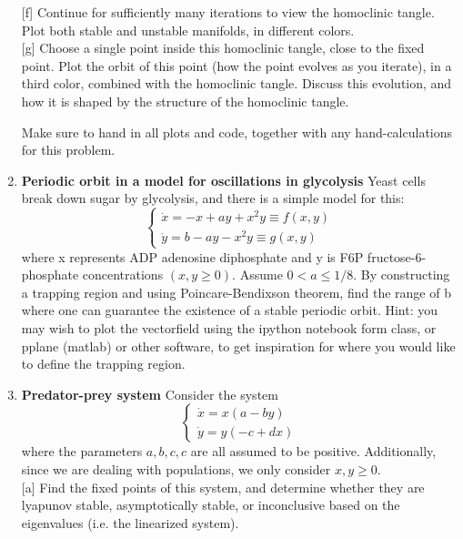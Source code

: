 \documentclass{article}
\begin{document}
\begin{enumerate}
[f] Continue for sufficiently many iterations to view the homoclinic tangle.
Plot both
stable and unstable manifolds, in different colors.\\

[g] Choose a single point inside this homoclinic tangle, close to the fixed point.
Plot the orbit of this point (how the point evolves as you iterate), in a third
color, combined with the homoclinic tangle. Discuss this evolution, and how it is shaped by the structure of the homoclinic tangle.  

Make sure to hand in all plots and code, together with any hand-calculations for this problem.

\item \textbf{Periodic orbit in a model for oscillations in glycolysis} Yeast cells break down
sugar by glycolysis, and there is a simple model for this:
\begin{equation}
\left\{\begin{array}{l}
\dot{x}=-x+a y+x^{2} y \equiv f(x, y) \\
\dot{y}=b-a y-x^{2} y \equiv g(x, y)
\end{array}\right.
\end{equation}
where x represents ADP adenosine diphosphate and y is F6P fructose-6-phosphate
concentrations $(x , y \ge 0)$. Assume $0 < a \le 1/8$. By constructing a trapping region
and using Poincare-Bendixson theorem, find the range of b where one can guarantee
the existence of a stable periodic orbit.  Hint:  you may wish to plot the vectorfield using the ipython notebook form class, or pplane (matlab) or other software, to get inspiration for where you would like to define the trapping region.

\item \textbf{Predator-prey system} Consider the system
\begin{equation}
\left\{\begin{array}{l}
\dot{x}=x(a-by) \\
\dot{y}=y(-c+dx)
\end{array}\right.
\end{equation}
where the parameters $a,b,c,c$ are all assumed to be positive. Additionally, since we are dealing with populations, we only consider $x,y \geq 0$.\\

[a] Find the fixed points of this system, and determine whether they are lyapunov stable, asymptotically stable, or inconclusive based on the eigenvalues (i.e. the linearized system).\\


\end{enumerate}
\end{document}
